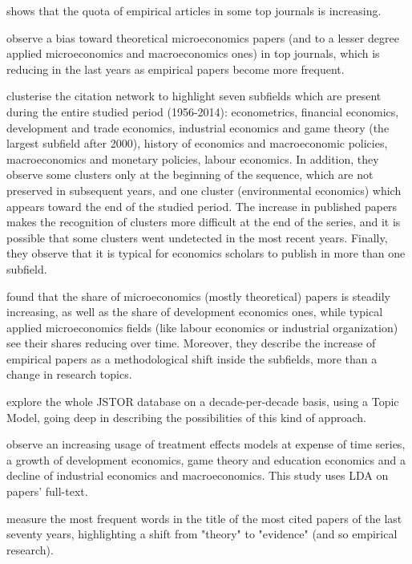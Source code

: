 \documentclass[a4paper, 11pt, headings=standardclasses, tablecaptionsbelow]{scrartcl}
\begin{document}
\textcite{hamermesh2013} shows that the quota of empirical articles in some top journals is increasing.

\textcite{card2013} observe a bias toward theoretical microeconomics papers (and to a lesser degree applied microeconomics and macroeconomics ones) in top journals, which is reducing in the last years as empirical papers become more frequent.

\textcite{claveau2016} clusterise the citation network to highlight seven subfields which are present during the entire studied period (1956-2014): econometrics, financial economics, development and trade economics, industrial economics and game theory (the largest subfield after 2000), history of economics and macroeconomic policies, macroeconomics and monetary policies, labour economics.
In addition, they observe some clusters only at the beginning of the sequence, which are not preserved in subsequent years, and one cluster (environmental economics) which appears toward the end of the studied period.
The increase in published papers makes the recognition of clusters more difficult at the end of the series, and it is possible that some clusters went undetected in the most recent years.
Finally, they observe that it is typical for economics scholars to publish in more than one subfield.

\textcite{angrist2017} found that the share of microeconomics (mostly theoretical) papers is steadily increasing, as well as the share of development economics ones, while typical applied microeconomics fields (like labour economics or industrial organization) see their shares reducing over time.
Moreover, they describe the increase of empirical papers as a methodological shift inside the subfields, more than a change in research topics.

\textcite{ambrosino2018} explore the whole JSTOR database on a decade-per-decade basis, using a Topic Model, going deep in describing the possibilities of this kind of approach.

\textcite{fontana2019} observe an increasing usage of treatment effects models at expense of time series, a growth of development economics, game theory and education economics and a decline of industrial economics and macroeconomics. This study uses LDA on papers' full-text.

\textcite{montesinos2019} measure the most frequent words in the title of the most cited papers of the last seventy years, highlighting a shift from "theory" to "evidence" (and so empirical research).
\end{document}
